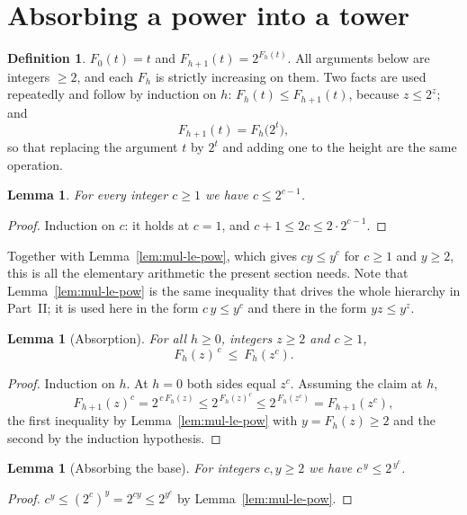 \documentclass[11pt,a4paper]{article}
\theoremstyle{plain}
\newtheorem{lemma}[theorem]{Lemma}
\theoremstyle{definition}
\newtheorem{definition}[theorem]{Definition}
\begin{document}
\section{Absorbing a power into a tower}\label{sec:absorb}

\begin{definition}\label{def:F}
$F_0(t)=t$ and $F_{h+1}(t)=2^{F_h(t)}$. All arguments below are integers $\ge2$, and
each $F_h$ is strictly increasing on them. Two facts are used repeatedly and follow by
induction on $h$: $F_h(t)\le F_{h+1}(t)$, because $z\le2^{z}$; and
\[
  F_{h+1}(t)=F_h\bigl(2^{t}\bigr),
\]
so that replacing the argument $t$ by $2^{t}$ and adding one to the height are the same
operation.
\end{definition}

\begin{lemma}\label{lem:basic}
For every integer $c\ge1$ we have $c\le2^{c-1}$.
\end{lemma}

\begin{proof}
Induction on $c$: it holds at $c=1$, and $c+1\le 2c\le2\cdot2^{c-1}$.
\end{proof}

Together with Lemma~\ref{lem:mul-le-pow}, which gives $cy\le y^{c}$ for $c\ge1$ and
$y\ge2$, this is all the elementary arithmetic the present section needs. Note that
Lemma~\ref{lem:mul-le-pow} is the same inequality that drives the whole hierarchy in
Part~II; it is used here in the form $c\,y\le y^{c}$ and there in the form
$yz\le y^{z}$.

\begin{lemma}[Absorption]\label{lem:absorb}
For all $h\ge0$, integers $z\ge2$ and $c\ge1$,
\[
  F_h(z)^{\,c}\ \le\ F_h(z^{c}).
\]
\end{lemma}

\begin{proof}
Induction on $h$. At $h=0$ both sides equal $z^{c}$. Assuming the claim at $h$,
\[
  F_{h+1}(z)^{c}=2^{\,c\,F_h(z)}\le2^{\,F_h(z)^{c}}\le2^{\,F_h(z^{c})}=F_{h+1}(z^{c}),
\]
the first inequality by Lemma~\ref{lem:mul-le-pow} with $y=F_h(z)\ge2$ and the second by the
induction hypothesis.
\end{proof}

\begin{lemma}[Absorbing the base]\label{lem:base}
For integers $c,y\ge2$ we have $c^{\,y}\le2^{\,y^{c}}$.
\end{lemma}

\begin{proof}
$c^{y}\le(2^{c})^{y}=2^{cy}\le2^{y^{c}}$ by Lemma~\ref{lem:mul-le-pow}.
\end{proof}
\end{document}
